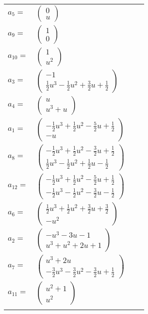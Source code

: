 \documentclass[1p]{elsarticle_modified}
\theoremstyle{definition}
\begin{document}
\begin{tabular}{m{7pt} m{180pt} m{7pt} m{180pt} }
\flushright $a_{5}=$&$\begin{pmatrix}0\\u\end{pmatrix}$ \\
\flushright $a_{9}=$&$\begin{pmatrix}1\\0\end{pmatrix}$ \\
\flushright $a_{10}=$&$\begin{pmatrix}1\\u^2\end{pmatrix}$ \\
\flushright $a_{3}=$&$\begin{pmatrix}-1\\\frac{1}{2} u^3-\frac{1}{2} u^2+\frac{3}{2} u+\frac{1}{2}\end{pmatrix}$ \\
\flushright $a_{4}=$&$\begin{pmatrix}u\\u^3+u\end{pmatrix}$ \\
\flushright $a_{1}=$&$\begin{pmatrix}-\frac{1}{2} u^3+\frac{1}{2} u^2-\frac{5}{2} u+\frac{1}{2}\\- u\end{pmatrix}$ \\
\flushright $a_{8}=$&$\begin{pmatrix}-\frac{1}{2} u^3+\frac{1}{2} u^2-\frac{3}{2} u+\frac{1}{2}\\\frac{1}{2} u^3-\frac{1}{2} u^2+\frac{1}{2} u-\frac{1}{2}\end{pmatrix}$ \\
\flushright $a_{12}=$&$\begin{pmatrix}-\frac{1}{2} u^3+\frac{1}{2} u^2-\frac{5}{2} u+\frac{1}{2}\\-\frac{1}{2} u^3-\frac{1}{2} u^2-\frac{3}{2} u-\frac{1}{2}\end{pmatrix}$ \\
\flushright $a_{6}=$&$\begin{pmatrix}\frac{1}{2} u^3+\frac{1}{2} u^2+\frac{3}{2} u+\frac{3}{2}\\- u^2\end{pmatrix}$ \\
\flushright $a_{2}=$&$\begin{pmatrix}- u^3-3 u-1\\u^3+u^2+2 u+1\end{pmatrix}$ \\
\flushright $a_{7}=$&$\begin{pmatrix}u^3+2 u\\-\frac{3}{2} u^3-\frac{3}{2} u^2-\frac{3}{2} u+\frac{1}{2}\end{pmatrix}$ \\
\flushright $a_{11}=$&$\begin{pmatrix}u^2+1\\u^2\end{pmatrix}$\\&\end{tabular}
\end{document}
